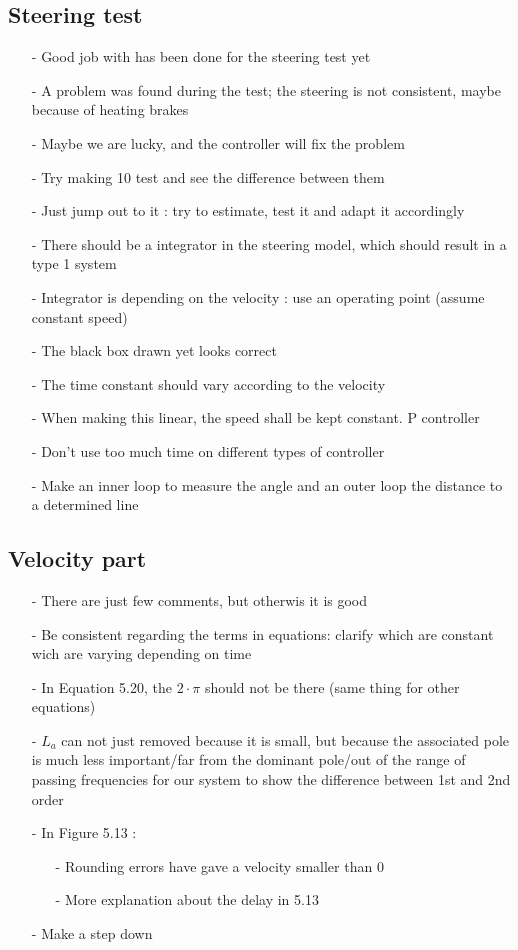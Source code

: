 \subsection{Steering test}
\begin{itemize}
  \item[-] Good job with has been done for the steering test yet
  \item[-] A problem was found during the test; the steering is not consistent, maybe because of heating brakes
  \item[-] Maybe we are lucky, and the controller will fix the problem
  \item[-] Try making 10 test and see the difference between them
  \item[-] Just jump out to it : try to estimate, test it and adapt it accordingly
  \item[-] There should be a integrator in the steering model, which should result in a type 1 system
  \item[-] Integrator is depending on the velocity : use an operating point (assume constant speed)
  \item[-] The black box drawn yet looks correct 
  \item[-] The time constant should vary according to the velocity
  \item[-] When making this linear, the speed shall be kept constant. P controller
  \item[-] Don't use too much time on different types of controller
  \item[-] Make an inner loop to measure the angle and an outer loop the distance to a determined line
\end{itemize}

\subsection{Velocity part}
\begin{itemize}
\item[-] There are just few comments, but otherwis it is good
\item[-] Be consistent regarding the terms in equations: clarify which are constant wich are varying depending on time
\item[-] In Equation 5.20, the $2 \cdot \pi$ should not be there (same thing for other equations)
\item[-] $L_a$ can not just removed because it is small, but because the associated pole is much less important/far from the dominant pole/out of the range of passing frequencies for our system to show the difference between 1st and 2nd order
\item[-] In Figure 5.13 : 
  \begin{itemize}
  \item[-] Rounding errors have gave a velocity smaller than 0
  \item[-] More explanation about the delay in 5.13
  \end{itemize}
\item[-] Make a step down
\end{itemize}


